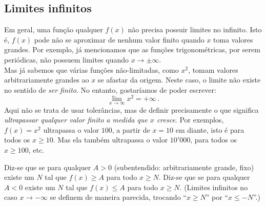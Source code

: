 \subsection{Limites infinitos}
Em geral, uma função qualquer $f(x)$ não precisa possuir limites no infinito.
Isto é, $f(x)$ pode não se aproximar de nenhum valor finito
quando $x$ toma valores grandes. Por exemplo, já mencionamos que as funções
trigonométricas, por serem periódicas, não possuem limites quando
$x\to \pm\infty$.\\

Mas já sabemos que várias funções
não-limitadas, como $x^2$, tomam valores arbitrariamente grandes ao
$x$ se afastar da origem. Neste caso, o limite não existe no sentido
de \emph{ser finito}. No entanto, gostaríamos de poder escrever:
$$
\lim_{x\to \infty}x^2=+\infty\,.
$$
Aqui não se trata de usar tolerâncias, mas de definir precisamente o
que significa \emph{ultrapassar qualquer valor finito a medida que
$x$ cresce}. 
Por exemplos, $f(x)=x^2$ ultrapassa o valor $100$, a partir de $x=10$ em
diante, isto é para todos 
os $x\geq 10$. Mas ela também ultrapassa o valor $10'000$, para
todos os $x\geq 100$, etc.

\begin{center}
\begin{bmlimage}\end{bmlimage}
\end{center}

\begin{defin}
Diz-se que  se
para qualquer $A>0$ (subentendido: arbitrariamente grande, fixo) 
existe um $N$ tal que $f(x)\geq A$ para todo
$x\geq N$. 
Diz-se que  se
para qualquer $A<0$ existe um $N$ tal que $f(x)\leq A$ para todo
$x\geq N$. 
(Limites infinitos no caso $x\to-\infty$ se definem de maneira
parecida, trocando ``$x\geq N$'' por ``$x\leq -N$''.)
\end{defin}

